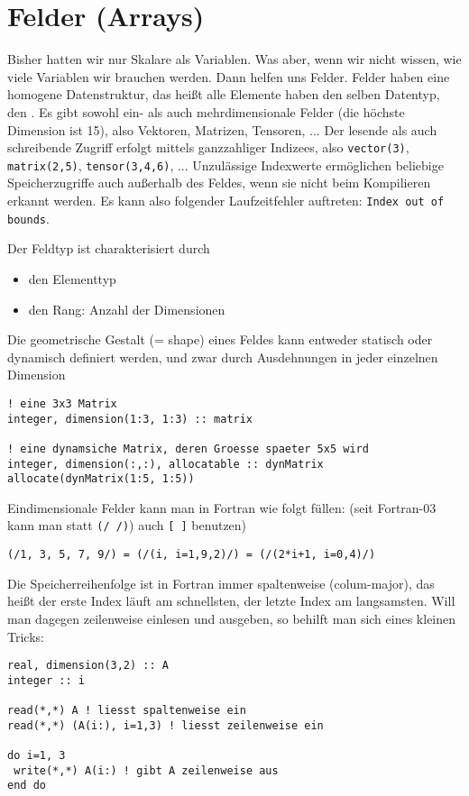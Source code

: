 \section{Felder (Arrays)}

Bisher hatten wir nur Skalare als Variablen. Was aber, wenn wir nicht wissen, wie viele Variablen wir brauchen werden. Dann helfen uns Felder. Felder haben eine homogene Datenstruktur, das heißt alle Elemente haben den selben Datentyp, den . Es gibt sowohl ein- als auch mehrdimensionale Felder (die höchste Dimension ist 15), also Vektoren, Matrizen, Tensoren, ... Der lesende als auch schreibende Zugriff erfolgt mittels ganzzahliger Indizees, also \texttt{vector(3)}, \texttt{matrix(2,5)}, \texttt{tensor(3,4,6)}, ... Unzulässige Indexwerte ermöglichen beliebige Speicherzugriffe auch außerhalb des Feldes, wenn sie nicht beim Kompilieren erkannt werden. Es kann also folgender Laufzeitfehler auftreten: \texttt{Index out of bounds}.

Der Feldtyp ist charakterisiert durch
\begin{itemize}
	\item den Elementtyp
	\item den Rang: Anzahl der Dimensionen
\end{itemize}

Die geometrische Gestalt (= shape) eines Feldes kann entweder statisch oder dynamisch definiert werden, und zwar durch Ausdehnungen in jeder einzelnen Dimension
\begin{lstlisting}
! eine 3x3 Matrix
integer, dimension(1:3, 1:3) :: matrix

! eine dynamsiche Matrix, deren Groesse spaeter 5x5 wird
integer, dimension(:,:), allocatable :: dynMatrix
allocate(dynMatrix(1:5, 1:5))
\end{lstlisting}

Eindimensionale Felder kann man in Fortran wie folgt füllen: (seit Fortran-03 kann man statt \texttt{(/ /)}) auch \texttt{[ ]} benutzen)
\begin{lstlisting}
(/1, 3, 5, 7, 9/) = (/(i, i=1,9,2)/) = (/(2*i+1, i=0,4)/)
\end{lstlisting}

Die Speicherreihenfolge ist in Fortran immer spaltenweise (colum-major), das heißt der erste Index läuft am schnellsten, der letzte Index am langsamsten. Will man dagegen zeilenweise einlesen und ausgeben, so behilft man sich eines kleinen Tricks:
\begin{lstlisting}
real, dimension(3,2) :: A
integer :: i

read(*,*) A ! liesst spaltenweise ein
read(*,*) (A(i:), i=1,3) ! liesst zeilenweise ein

do i=1, 3
 write(*,*) A(i:) ! gibt A zeilenweise aus
end do
\end{lstlisting}

